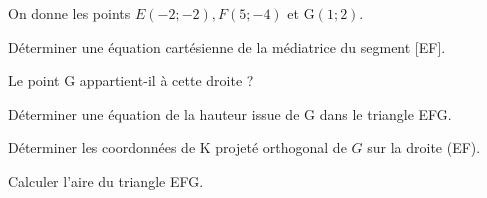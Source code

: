 \documentclass[11pt,a4paper]{article}  %
\begin{document}
\exerciceDS{} %
On donne les points $E(-2 ;-2), F(5 ;-4)$ et $\mathrm{G}(1 ; 2)$.
\begin{enumMet}
	\item Déterminer une équation cartésienne de la médiatrice du segment [EF].
	\item Le point $\mathrm{G}$ appartient-il à cette droite ?
	\item Déterminer une équation de la hauteur issue de $\mathrm{G}$ dans le triangle EFG.
	\item Déterminer les coordonnées de K projeté orthogonal de $G$ sur la droite (EF).
	\item Calculer l'aire du triangle EFG.
\end{enumMet}
\end{document}
